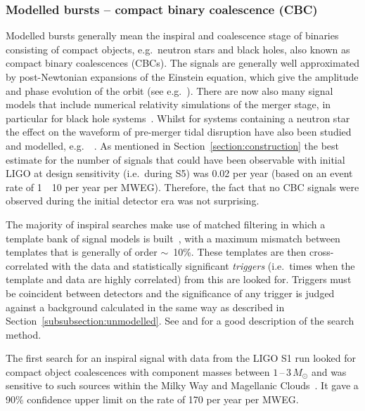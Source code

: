 \subsubsection{Modelled bursts -- compact binary coalescence (CBC)}
\label{sec:cbc} 

Modelled bursts generally mean the inspiral and coalescence stage of binaries consisting of compact objects, 
e.g.\ neutron stars and black holes, also known as compact binary coalescences (CBCs). The signals are generally
well approximated by post-Newtonian expansions of the Einstein equation, which give the amplitude and
phase evolution of the orbit (see e.g.\ \cite{lrr-2007-2, lrr-2014-2}). There are now also many signal models 
that include numerical relativity simulations \cite{lrr-2015-1} of the merger stage, in particular for black 
hole systems~\cite{Aylott:2009, 2014CQGra..31k5004A}. Whilst for systems containing a neutron star the 
effect on the waveform of pre-merger tidal disruption have also been studied and modelled, e.g.\ 
~\cite{2009PhRvD..79l4033R, 2010PhRvD..81f4026F}. As mentioned in Section~\ref{section:construction} the best 
estimate for the number of signals that could have been observable with initial LIGO at design sensitivity 
(i.e.\ during S5) was 0.02 per year (based on an event rate of 1~\texttimes~10\super{-6} per year per MWEG). 
Therefore, the fact that no CBC signals were observed during the initial detector era was not surprising.

The majority of inspiral searches make use of matched filtering in which a template bank of signal models is 
built~\cite{Owen:1996, Owen:1999}, with a maximum mismatch between templates that is generally of order 
$\sim$~10\%. These templates are then cross-correlated with the data and statistically significant
\textit{triggers} (i.e.\ times when the template and data are highly correlated) from this are looked for. 
Triggers must be coincident between detectors and the significance of any trigger is judged against a 
background calculated in the same way as described in Section~\ref{subsubsection:unmodelled}. See
\cite{Abbott:2005b} and \cite{2012PhRvD..85l2006A} for a good description of the search method.

The first search for an inspiral signal with data from the LIGO S1 run looked for compact object coalescences 
with component masses between $1$\,--\,$3\,M_{\odot}$ and was sensitive to such sources within the Milky Way 
and Magellanic Clouds~\cite{Abbott:2004c}. It gave a 90\% confidence upper limit on the rate of 170 per year 
per MWEG.

